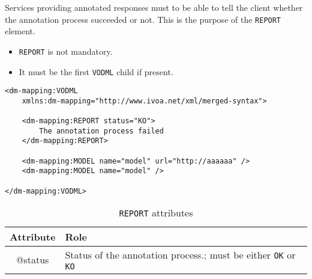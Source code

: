 Services providing annotated responses must 
to be able to tell the client whether the annotation process succeeded or not.
This is the purpose of the \texttt{REPORT} element.

\begin{itemize}
\item \texttt{REPORT} is not mandatory.
\item It must be the first \texttt{VODML} child if present.
\end{itemize}



\begin{lstlisting}[frame=single,caption={Example of a REPORT element},style=XML,basicstyle=\tiny]
<dm-mapping:VODML
	xmlns:dm-mapping="http://www.ivoa.net/xml/merged-syntax">
	
	<dm-mapping:REPORT status="KO">
	    The annotation process failed
	</dm-mapping:REPORT>

	<dm-mapping:MODEL name="model" url="http://aaaaaa" />
	<dm-mapping:MODEL name="model" />
	
</dm-mapping:VODML>
\end{lstlisting}

\begin{table}[!htbp]
  \small
  \centering
  \begin{tabulary}{\linewidth}{|c|J|}       
    \hline 
         \textbf{Attribute} & 
         \textbf {Role}\\
    \hline
    \hline  
         @status  & 
        Status of the annotation process.; must be either \texttt{OK} or \texttt{KO} \\
    \hline 
  \end{tabulary}
  \caption{\texttt{REPORT} attributes} 
  \label{tbl:model-att}
\end{table}

